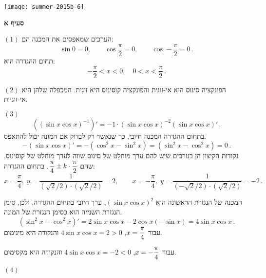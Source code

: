 \begin{center}
\texttt{[image: summer-2015b-6]}
\end{center}

\textbf{סעיף א}

$(1)$
הערכים שמאפסים את המכנה הם:
\[
\sin 0=0,\quad\quad \cos \frac{\pi}{2}= 0,\quad\quad \cos -\frac{\pi}{2}=0\,.
\]
תחום ההגדרה הוא:
\[
-\frac{\pi}{2} < x < 0,\quad 0 < x < \frac{\pi}{2}\,.
\]

$(2)$
הפונקציה סינוס היא אי-זוגית והפונקציה קוסינוס היא זוגית. המכפלה שלהן היא אי-זוגיות.

$(3)$
\[
((\sin x \cos x)^{-1})'= -1\cdot (\sin x \cos x)^{-2}(\sin x\cos x)'\,.
\]
בתחום ההגדרה המכנה חיובי, כך שנאשר רק לבדוק אם המונה יכול להתאפס.
\[
-(\sin x\cos x)'=-(\cos^2 x-\sin^2 x)=(\sin^2 x-\cos^2 x)=0\,.
\]
נקודות הקיצון הן בערכים שיש להם ערך מוחלט של סינוס שווה לערך מוחלט של קוסינוס, שהם
$\displaystyle\frac{\pi}{4}\pm k\cdot\displaystyle\frac{\pi}{2}$.
בתחום ההגדרה:
\[
x=\frac{\pi}{4},\; y=\frac{1}{(\sqrt{2}/2)\cdot(\sqrt{2}/2)}= 2,\quad\quad x=-\frac{\pi}{4},\; y=\frac{1}{(-\sqrt{2}/2)\cdot(\sqrt{2}/2)}= -2\,.
\]

\np

המכנה של הנגזרת הראשונה הוא 
$(\sin x \cos x)^2$,
ערך חיובי בתחום ההגדרה, ולכן, סימן הנגזרת השנייה הוא כסימן הנגזרת של המונה.
\[
(\sin^2 x-\cos^2 x)'=2\sin x \cos x -2 \cos x (-\sin x)=4\sin x\cos x\,.
\]
עבור
$x=\displaystyle\frac{\pi}{4}$,
$4\sin x\cos x=2>0$
והנקודה היא מינימום.

עבור
$x=-\displaystyle\frac{\pi}{4}$,
$4\sin x\cos x=-2<0$
והנקודה היא מקסימום.

$(4)$
\begin{center}
\end{center}

